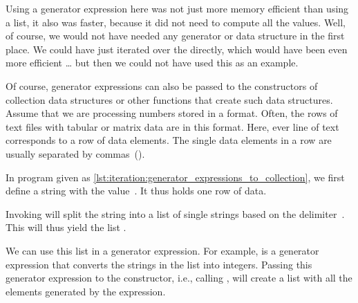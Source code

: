Using a generator expression here was not just more memory efficient than using a list, it also was faster, because it did not need to compute all the values.
Well, of course, we would not have needed any generator or data structure in the first place.
We could have just iterated over the  directly, which would have been even more efficient {\dots} but then we could not have used this as an example.

%
%
%
%
%
%
Of course, generator expressions can also be passed to the constructors of collection data structures or other functions that create such data structures.
Assume that we are processing numbers stored in a  format.
Often, the rows of text files with tabular or matrix data are in this format.
Here, ever line of text corresponds to a row of data elements.
The single data elements in a row are usually separated by commas~(\inQuotes{,}).

In program  given as \cref{lst:iteration:generator_expressions_to_collection}, we first define a string  with the value~.
It thus holds one row of  data.

Invoking  will split the string into a list of single strings based on the delimiter~\pythonil{\",\"}.
This will thus yield the list \pythonil{[\"22\", \"56\", \"33\", \"67\", \"43\", \"33\", \"12\"]}.

We can use this list in a generator expression.
For example,  is a generator expression that converts the strings in the list into integers.
Passing this generator expression to the  constructor, i.e., calling , will create a list with all the elements generated by the expression.

